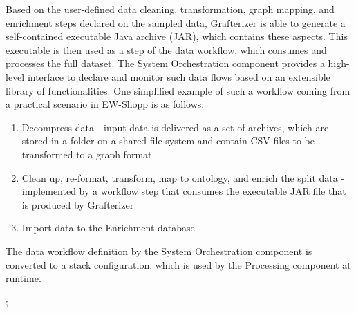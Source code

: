 Based on the user-defined data cleaning, transformation, graph mapping, and enrichment steps declared on the sampled data, Grafterizer is able to generate a self-contained executable Java archive (JAR), which contains these aspects. This executable is then used as a step of the data workflow, which consumes and processes the full dataset. The System Orchestration component provides a high-level interface to declare and monitor such data flows based on an extensible library of functionalities. One simplified example of such a workflow coming from a practical scenario in EW-Shopp is as follows:
\begin{enumerate}
    \item Decompress data - input data is delivered as a set of archives, which are stored in a folder on a shared file system and contain CSV files to be transformed to a graph format
    \item Clean up, re-format, transform, map to ontology, and enrich the split data - implemented by a workflow step that consumes the executable JAR file that is produced by Grafterizer
    \item Import data to the Enrichment database
\end{enumerate}

The data workflow definition by the System Orchestration component is converted to a stack configuration, which is used by the Processing component at runtime.

 \label{sec:bdr};